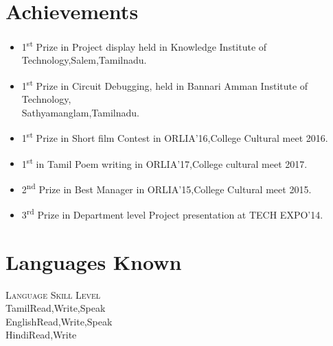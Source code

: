 \documentclass[a4paper,12pt,line]{article}
\begin{document}
	\section*{{\color{magenta}Achievements}}
	\begin{itemize}
		\item 1\textsuperscript{st} Prize in Project display held in Knowledge Institute of Technology,Salem,Tamilnadu.
		\item 1\textsuperscript{st} Prize in Circuit Debugging, held in Bannari Amman Institute of Technology,\\Sathyamanglam,Tamilnadu.
		\item 1\textsuperscript{st} Prize in Short film Contest in ORLIA’16,College Cultural meet 2016.
		\item 1\textsuperscript{st} in Tamil Poem writing in ORLIA'17,College cultural meet 2017.
		\item 2\textsuperscript{nd} Prize in Best Manager in ORLIA’15,College Cultural meet 2015.
		\item 3\textsuperscript{rd} Prize in Department level Project presentation at TECH EXPO’14.
	\end{itemize}


	\section*{{\color{magenta}Languages Known}}
	\centering
	\vspace{1pt}
	\color{blue}\textsc{Language} \hspace*{2cm}\color{blue}\textsc{Skill Level}\\
	\hspace*{0.7cm}\color{black}Tamil\hspace*{2.7cm}Read,Write,Speak\\
	\hspace*{0.7cm}English\hspace*{2.3cm}Read,Write,Speak\\
	\hspace*{-0.5cm}Hindi\hspace*{2.6cm}Read,Write\\
	
\end{document}
